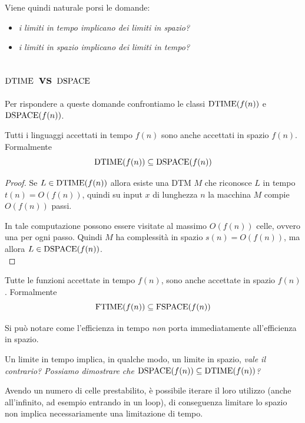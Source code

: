 Viene quindi naturale porsi le domande: 
\begin{itemize}
	\item \textit{i limiti in tempo implicano dei limiti in spazio?}
	\item \textit{i limiti in spazio implicano dei limiti in tempo?}
\end{itemize}

\subsection{$\text{DTIME}$ vs $\text{DSPACE}$}

Per rispondere a queste domande confrontiamo le classi $\text{DTIME} (f(n))$ e $\text{DSPACE} (f(n))$. \\

\begin{theor}
	Tutti i linguaggi accettati in tempo $f(n)$ sono anche accettati in spazio $f(n)$. Formalmente
	$$ \text{DTIME} (f(n)) \subseteq \text{DSPACE} (f(n)) $$
\end{theor}
\begin{proof}
	Se $L \in \text{DTIME}(f(n))$ allora esiste una DTM $M$ che riconosce $L$ in tempo $t(n) = O(f(n))$, quindi su input $x$ di lunghezza $n$ la macchina $M$ compie $O(f(n))$ passi.
	
	In tale computazione possono essere visitate al massimo $O(f(n))$ celle, ovvero una per ogni passo. Quindi $M$ ha complessità in spazio $s(n) = O(f(n))$, ma allora $L \in \text{DSPACE} (f(n))$.\\
\end{proof}

\begin{theor}
	Tutte le funzioni accettate in tempo $f(n)$, sono anche accettate in spazio $f(n)$. Formalmente
	$$ \text{FTIME} (f(n)) \subseteq \text{FSPACE} (f(n)) $$
\end{theor}

\vspace{-0.15cm}

Si può notare come l'efficienza in tempo \textit{non} porta immediatamente all'efficienza in spazio.

Un limite in tempo implica, in qualche modo, un limite in spazio, \textit{vale il contrario? Possiamo dimostrare che $\text{DSPACE} (f(n)) \subseteq \text{DTIME}(f(n))$?}

Avendo un numero di celle prestabilito, è possibile iterare il loro utilizzo (anche all'infinito, ad esempio entrando in un loop), di conseguenza limitare lo spazio non implica necessariamente una limitazione di tempo.

